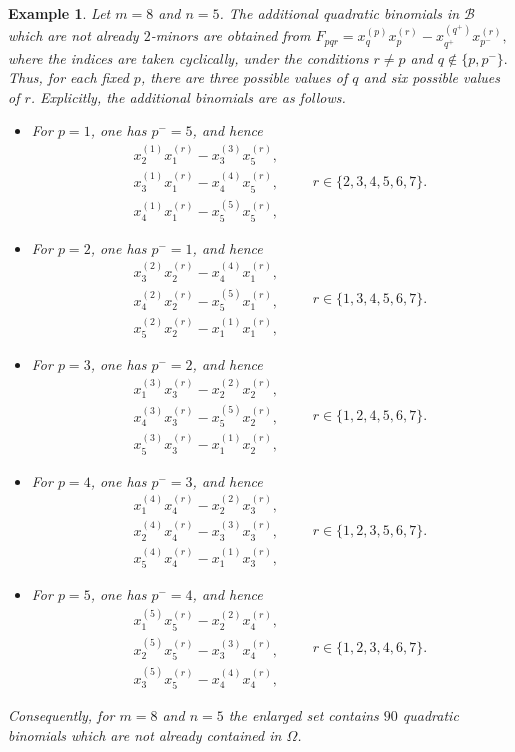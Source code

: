 \documentclass[12pt]{amsart}
\numberwithin{equation}{section}
\newcommand{\Bc}{\mathcal{B}}
\newtheorem{Example}[Theorem]{Example}
\begin{document}
\begin{Example}
{\em    
Let $m=8$ and $n=5$.  The additional quadratic binomials in $\Bc$ which are not already
$2$-minors are obtained from $F_{pqr}
=
x_q^{(p)}x_p^{(r)}
-
x_{q^+}^{(q^+)}x_{p^-}^{(r)},$ where the indices are taken cyclically, under the conditions $r\neq p$ and $q\notin\{p,p^-\}.$ Thus, for each fixed $p$, there are three possible values of $q$ and
six possible values of $r$. Explicitly, the additional binomials are
as follows.

\begin{itemize}
\item
For $p=1$, one has $p^-=5$, and hence
\[
\begin{aligned}
&x_2^{(1)}x_1^{(r)}-x_3^{(3)}x_5^{(r)},\\
&x_3^{(1)}x_1^{(r)}-x_4^{(4)}x_5^{(r)},\\
&x_4^{(1)}x_1^{(r)}-x_5^{(5)}x_5^{(r)},
\end{aligned}
\qquad r\in\{2,3,4,5,6,7\}.
\]

\item
For $p=2$, one has $p^-=1$, and hence
\[
\begin{aligned}
&x_3^{(2)}x_2^{(r)}-x_4^{(4)}x_1^{(r)},\\
&x_4^{(2)}x_2^{(r)}-x_5^{(5)}x_1^{(r)},\\
&x_5^{(2)}x_2^{(r)}-x_1^{(1)}x_1^{(r)},
\end{aligned}
\qquad r\in\{1,3,4,5,6,7\}.
\]

\item
For $p=3$, one has $p^-=2$, and hence
\[
\begin{aligned}
&x_1^{(3)}x_3^{(r)}-x_2^{(2)}x_2^{(r)},\\
&x_4^{(3)}x_3^{(r)}-x_5^{(5)}x_2^{(r)},\\
&x_5^{(3)}x_3^{(r)}-x_1^{(1)}x_2^{(r)},
\end{aligned}
\qquad r\in\{1,2,4,5,6,7\}.
\]

\item
For $p=4$, one has $p^-=3$, and hence
\[
\begin{aligned}
&x_1^{(4)}x_4^{(r)}-x_2^{(2)}x_3^{(r)},\\
&x_2^{(4)}x_4^{(r)}-x_3^{(3)}x_3^{(r)},\\
&x_5^{(4)}x_4^{(r)}-x_1^{(1)}x_3^{(r)},
\end{aligned}
\qquad r\in\{1,2,3,5,6,7\}.
\]

\item
For $p=5$, one has $p^-=4$, and hence
\[
\begin{aligned}
&x_1^{(5)}x_5^{(r)}-x_2^{(2)}x_4^{(r)},\\
&x_2^{(5)}x_5^{(r)}-x_3^{(3)}x_4^{(r)},\\
&x_3^{(5)}x_5^{(r)}-x_4^{(4)}x_4^{(r)},
\end{aligned}
\qquad r\in\{1,2,3,4,6,7\}.
\]
\end{itemize}
Consequently, for $m=8$ and $n=5$ the enlarged set contains $90$ quadratic binomials which are not already contained in $\Omega$.

}
\end{Example}
\end{document}

